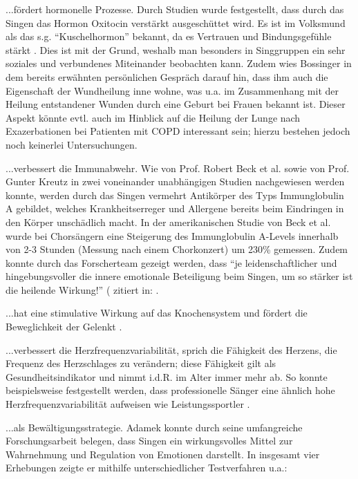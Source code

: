 ...fördert hormonelle Prozesse. Durch Studien wurde festgestellt, dass durch das Singen das Hormon Oxitocin verstärkt ausgeschüttet wird. 
Es ist im Volksmund als das s.g. "`Kuschelhormon"' bekannt, da es Vertrauen und Bindungsgefühle stärkt \autocite[vgl.][]{geokompakt2013}. Dies ist mit der Grund, weshalb man besonders in Singgruppen ein sehr soziales und verbundenes Miteinander beobachten kann. Zudem wies Bossinger in dem bereits erwähnten persönlichen Gespräch darauf hin, dass ihm auch die Eigenschaft der Wundheilung inne wohne, was u.a. im Zusammenhang mit der Heilung entstandener Wunden durch eine Geburt bei Frauen bekannt ist. Dieser Aspekt könnte evtl. auch im Hinblick auf die Heilung der Lunge nach Exazerbationen bei Patienten mit COPD interessant sein; hierzu bestehen jedoch noch keinerlei Untersuchungen.

...verbessert die Immunabwehr. Wie von Prof. Robert Beck et al. sowie von Prof. Gunter Kreutz in zwei voneinander unabhängigen Studien nachgewiesen werden konnte, werden durch das Singen vermehrt Antikörper des Typs Immunglobulin A gebildet, welches Krankheitserreger und Allergene bereits beim Eindringen in den Körper unschädlich macht. In der amerikanischen Studie von Beck et al. wurde bei Chorsängern eine Steigerung des Immunglobulin A-Levels innerhalb von 2-3 Stunden (Messung nach einem Chorkonzert) um 230\% gemessen. Zudem konnte durch das Forscherteam gezeigt werden, dass "`je leidenschaftlicher und hingebungsvoller die innere emotionale Beteiligung beim Singen, um so stärker ist die heilende Wirkung!"' (\cite{fisher2001} zitiert in: \cite[157]{bossinger2006}.

...hat eine stimulative Wirkung auf das Knochensystem und fördert die Beweglichkeit der Gelenkt \autocite[vgl.][201]{cramer1998}.

...verbessert die Herzfrequenzvariabilität, sprich die Fähigkeit des Herzens, die Frequenz des Herzschlages zu verändern; diese Fähigkeit gilt als Gesundheitsindikator und nimmt i.d.R. im Alter immer mehr ab. So konnte beispielsweise festgestellt werden, dass professionelle Sänger eine ähnlich hohe Herzfrequenzvariabilität aufweisen wie Leistungssportler \autocite[vgl.][]{bossinger2014}. 

...als Bewältigungsstrategie. Adamek konnte durch seine umfangreiche Forschungsarbeit belegen, dass Singen ein wirkungsvolles Mittel zur Wahrnehmung und Regulation von Emotionen darstellt. In insgesamt vier Erhebungen zeigte er mithilfe unterschiedlicher Testverfahren u.a.:

